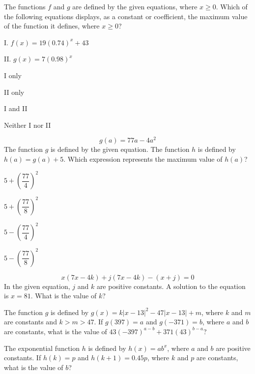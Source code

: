 \vfill
\noindent\begin{minipage}{\linewidth}
\par\smallskip
The functions $f$ and $g$ are defined by the given equations, where $x\ge0$. Which of the following equations displays, as a constant or coefficient, the maximum value of the function it defines, where $x\ge0$?\par\smallskip I. $f(x)=19(0.74)^x+43$\par II. $g(x)=7(0.98)^x$
\begin{satchoices}
  \item[A)] I only
  \item[B)] II only
  \item[C)] I and II
  \item[D)] Neither I nor II
\end{satchoices}
\end{minipage}
\vfill
\noindent\begin{minipage}{\linewidth}
\par\smallskip
$$g(a)=77a-4a^2$$ The function $g$ is defined by the given equation. The function $h$ is defined by $h(a)=g(a)+5$. Which expression represents the maximum value of $h(a)$?
\begin{satchoices}
  \item[A)] $5+\left(\dfrac{77}{4}\right)^2$
  \item[B)] $5+\left(\dfrac{77}{8}\right)^2$
  \item[C)] $5-\left(\dfrac{77}{4}\right)^2$
  \item[D)] $5-\left(\dfrac{77}{8}\right)^2$
\end{satchoices}
\end{minipage}
\vfill
\clearpage
\noindent\begin{minipage}{\linewidth}
\par\smallskip
$$x(7x-4k)+j(7x-4k)-(x+j)=0$$ In the given equation, $j$ and $k$ are positive constants. A solution to the equation is $x=81$. What is the value of $k$?
\end{minipage}
\vfill
\noindent\begin{minipage}{\linewidth}
\par\smallskip
The function $g$ is defined by $g(x)=k|x-13|^2-47|x-13|+m$, where $k$ and $m$ are constants and $k>m>47$. If $g(397)=a$ and $g(-371)=b$, where $a$ and $b$ are constants, what is the value of $43(-397)^{a-b}+371(43)^{b-a}$?
\end{minipage}
\vfill
\noindent\begin{minipage}{\linewidth}
\par\smallskip
The exponential function $h$ is defined by $h(x)=ab^x$, where $a$ and $b$ are positive constants. If $h(k)=p$ and $h(k+1)=0.45p$, where $k$ and $p$ are constants, what is the value of $b$?
\end{minipage}

